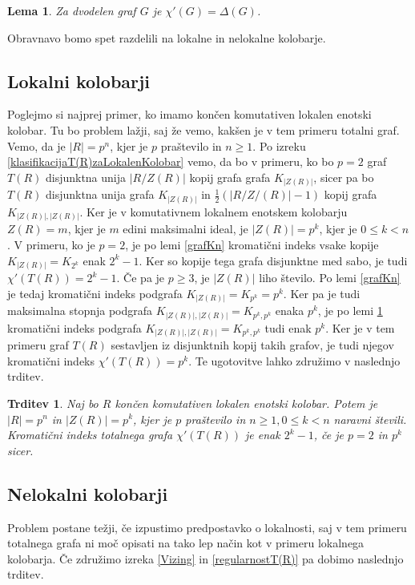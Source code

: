 \documentclass[a4paper, 12pt]{amsart}
\theoremstyle{definition} %
\theoremstyle{plain} %
\newtheorem{lema}[definicija]{Lema}
\newtheorem{trditev}[definicija]{Trditev}
\begin{document}
\begin{lema}
\label{dvodelenGraf}
Za dvodelen graf $G$ je $\chi'(G) = \Delta(G)$.
\end{lema}
Obravnavo bomo spet razdelili na lokalne in nelokalne kolobarje.

\subsection{Lokalni kolobarji}
Poglejmo si najprej primer, ko imamo končen komutativen lokalen enotski kolobar.  Tu bo problem lažji, saj že vemo, kakšen je v tem primeru totalni graf. Vemo, da je $|R| = p^n$, kjer je $p$ praštevilo in $n\ge 1$. Po izreku \ref{klasifikacijaT(R)zaLokalenKolobar} vemo, da bo v primeru, ko bo $p=2$ graf $T(R)$ disjunktna unija $|R/Z(R)|$ kopij grafa grafa $K_{|Z(R)|}$, sicer pa bo $T(R)$ disjunktna unija grafa $K_{|Z(R)|}$ in $\frac{1}{2}(|R/Z/(R)| - 1)$ kopij grafa $K_{|Z(R)|,|Z(R)|}$. Ker je v komutativnem lokalnem enotskem kolobarju $Z(R) = m$, kjer je $m$ edini maksimalni ideal, je $|Z(R)| = p^k$, kjer je $0 \le k < n$. V primeru, ko je $p=2$, je po lemi \ref{grafKn} kromatični indeks vsake kopije $K_{|Z(R)|} = K_{2^k}$ enak $2^k -1$. Ker so kopije tega grafa disjunktne med sabo, je tudi $\chi'(T(R)) = 2^k - 1$. Če pa je $p\ge 3$, je $|Z(R)|$ liho število. Po lemi \ref{grafKn} je tedaj kromatični indeks podgrafa $K_{|Z(R)|} = K_{p^k} = p^k$. Ker pa je tudi maksimalna stopnja podgrafa $K_{|Z(R)|,|Z(R)|} = K_{p^k,p^k}$ enaka $p^k$, je po lemi \ref{dvodelenGraf} kromatični indeks podgrafa $K_{|Z(R)|,|Z(R)|} = K_{p^k,p^k}$ tudi enak $p^k$. Ker je v tem primeru graf $T(R)$ sestavljen iz disjunktnih kopij takih grafov, je tudi njegov kromatični indeks $\chi'(T(R)) = p^k$. Te ugotovitve lahko združimo v naslednjo trditev.

\begin{trditev}
\label{kromaticniIndeksT(R)zaLokalniKolobar}
Naj bo $R$ končen komutativen lokalen enotski kolobar. Potem je $|R|=p^n$ in $|Z(R)| = p^k$, kjer je $p$ praštevilo in $n\ge 1, 0 \le k < n$  naravni števili. Kromatični indeks totalnega grafa $\chi'(T(R))$ je enak $2^k -1$, če je $p=2$ in $p^k$ sicer.
\end{trditev}

\subsection{Nelokalni kolobarji}
Problem postane težji, če izpustimo predpostavko o lokalnosti, saj v tem primeru totalnega grafa ni moč opisati na tako lep način kot v primeru lokalnega kolobarja. Če združimo izreka \ref{Vizing} in \ref{regularnostT(R)} pa dobimo naslednjo trditev.
\end{document}
